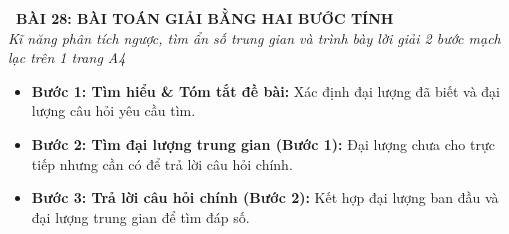 \documentclass[11pt,a4paper]{article}
\begin{document}
\begin{tcolorbox}[
  enhanced,
  colback=white,
  colframe=primary,
  arc=3mm,
  boxrule=1.2pt,
  left=4mm, right=4mm, top=2.5mm, bottom=2.5mm,
  drop shadow=black!10!white
]
  \centering
  {\Large\bfseries\color{primary}\faBookmark\ BÀI 28: BÀI TOÁN GIẢI BẰNG HAI BƯỚC TÍNH}\\[1.5mm]
  {\small\itshape\color{black!75}Kĩ năng phân tích ngược, tìm ẩn số trung gian và trình bày lời giải 2 bước mạch lạc trên 1 trang A4}
\end{tcolorbox}

\vspace{-2mm}


\noindent
\begin{minipage}[t]{0.49\textwidth}\vspace{0pt}
\begin{tcolorbox}[
  enhanced,
  colback=blue!4!white,
  colframe=blue!75!black,
  arc=2mm, boxrule=0.8pt,
  left=2mm, right=2mm, top=1.8mm, bottom=1.8mm,
  title={\footnotesize\bfseries\color{white}\faKey\ 1. Quy trình 3 bước giải bài toán 2 bước}
]
{\footnotesize
\begin{itemize}\setlength{\itemsep}{1.5pt}\setlength{\leftskip}{-2.5mm}
  \item \textbf{Bước 1: Tìm hiểu \& Tóm tắt đề bài:}
  Xác định đại lượng đã biết và đại lượng câu hỏi yêu cầu tìm.
  \item \textbf{Bước 2: Tìm đại lượng trung gian (Bước 1):}
  Đại lượng chưa cho trực tiếp nhưng cần có để trả lời câu hỏi chính.
  \item \textbf{Bước 3: Trả lời câu hỏi chính (Bước 2):}
  Kết hợp đại lượng ban đầu và đại lượng trung gian để tìm đáp số.
\end{itemize}
}
\end{tcolorbox}
\end{minipage}
\hfill
\end{document}

